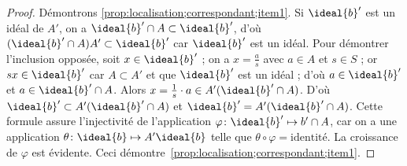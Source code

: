 \documentclass[11pt, %
  title in boldface,
  theorem in new line,
  theorem numbering = section,
  number theorems separately,
  simple name,
]{beaulivre}
\begin{document}
    \begin{proof}
        Démontrons \ref{prop:localisation;correspondant;item1}. Si \( \ideal{b}' \) est un idéal de \( A' \), on a \( \ideal{b}' \cap A \subset \ideal{b}' \), d'où \( (\ideal{b}' \cap A) A' \subset \ideal{b}' \) car \( \ideal{b}' \) est un idéal. Pour démontrer l'inclusion opposée, soit \( x \in \ideal{b}' \) ; on a \( x = \frac{a}{s} \) avec \( a \in A \) et \( s \in S \) ; or \( sx \in \ideal{b}' \) car \( A \subset A' \) et que \( \ideal{b}' \) est un idéal ; d'où \( a \in \ideal{b}' \) et \( a \in \ideal{b}' \cap A \). Alors \( x = \frac{1}{s} \cdot a \in A' (\ideal{b}' \cap A) \). D'où \( \ideal{b}' \subset A'(\ideal{b}' \cap A) \) et \( \ideal{b}' = A'(\ideal{b}' \cap A) \). Cette formule assure l'injectivité de l'application \( \varphi \colon \ideal{b}' \mapsto {b}' \cap A \), car on a une application \( \theta \colon \ideal{b} \mapsto A' \ideal{b} \) telle que \( \theta \circ \varphi = \text{identité} \). La croissance de \( \varphi \) est évidente. Ceci démontre~\ref{prop:localisation;correspondant;item1}.


\end{proof}
\end{document}
